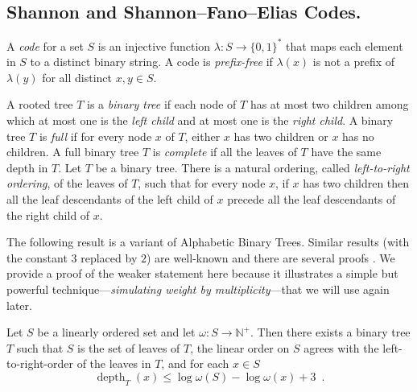 \documentclass[twoside,leqno]{article}
\newcommand{\N}{\mathbb{N}}
\renewcommand{\le}{\leqslant}
\newcommand{\defin}[1]{\emph{\textcolor{brightmaroon}{#1}}}
\DeclareMathOperator{\depth}{depth}
\begin{document}
\subsection{Shannon and Shannon--Fano--Elias Codes.}

A \defin{code} for a set $S$ is an injective function $\lambda:S\to\{0,1\}^*$ that maps each element in $S$ to a distinct binary string.  A code is \defin{prefix-free} if $\lambda(x)$ is not a prefix of $\lambda(y)$ for all distinct $x,y\in S$.

A rooted tree $T$ is a \defin{binary tree} if each node of $T$ has at most two children among which at most one is the \defin{left child} and at most one is the \defin{right child}.
A binary tree $T$ is \defin{full} if for every node $x$ of $T$,
either $x$ has two children or $x$ has no children.
A full binary tree $T$ is \defin{complete} if all the leaves of $T$ have the same depth in $T$.
Let $T$ be a binary tree. There is a natural ordering, called \defin{left-to-right ordering}, of the leaves of $T$, such that for every node $x$, if $x$ has two children then all the leaf descendants of the left child of $x$ precede all the leaf descendants of the right child of $x$.

The following result is a variant of Alphabetic Binary Trees. Similar results (with the constant $3$ replaced by $2$) are well-known and there are several proofs \cite{knuth:art_iii,mehlhorn:nearly,gilbert.moore:variable_length}. We provide a proof of the weaker statement here because it illustrates a simple but powerful technique---\defin{simulating weight by multiplicity}---that we will use again later.

\begin{lem}\label{shannon_fano_elias_tree}
  Let $S$ be a linearly ordered set and let $\omega:S\to\N^+$. Then there exists a binary tree $T$ such that $S$ is the set of leaves of $T$,
  the linear order on $S$ agrees with the left-to-right-order of the leaves in $T$, and for each $x\in S$
  \[
    \depth_{T}(x)\le \log\omega(S) - \log\omega(x) + 3 \enspace.
  \]
\end{lem}
\end{document}
